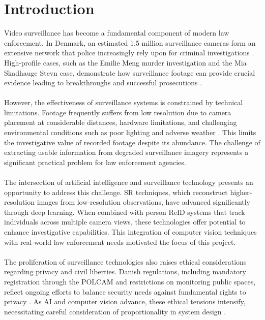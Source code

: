 \chapter{Introduction}
\label{cha:introduction}

Video surveillance has become a fundamental component of modern law enforcement. In Denmark, an estimated 1.5 million surveillance cameras form an extensive network that police increasingly rely upon for criminal investigations \cite{overvagningsekspert2025}. High-profile cases, such as the Emilie Meng murder investigation and the Mia Skadhauge Stevn case, demonstrate how surveillance footage can provide crucial evidence leading to breakthroughs and successful prosecutions \cite{emilie_meng_avisen, mia_stevn_avisen}.
\\\\
However, the effectiveness of surveillance systems is constrained by technical limitations. Footage frequently suffers from low resolution due to camera placement at considerable distances, hardware limitations, and challenging environmental conditions such as poor lighting and adverse weather \cite{arxiv_superres2021}. This limits the investigative value of recorded footage despite its abundance. The challenge of extracting usable information from degraded surveillance imagery represents a significant practical problem for law enforcement agencies.
\\\\
The intersection of artificial intelligence and surveillance technology presents an opportunity to address this challenge. \ac{SR} techniques, which reconstruct higher-resolution images from low-resolution observations, have advanced significantly through deep learning. When combined with person \ac{ReID} systems that track individuals across multiple camera views, these technologies offer potential to enhance investigative capabilities. This integration of computer vision techniques with real-world law enforcement needs motivated the focus of this project. 
\\\\
The proliferation of surveillance technologies also raises ethical considerations regarding privacy and civil liberties. Danish regulations, including mandatory registration through the \ac{POLCAM} and restrictions on monitoring public spaces, reflect ongoing efforts to balance security needs against fundamental rights to privacy \cite{politiet2024registrer, lov_tv_overvaagning2023}. As \ac{AI} and computer vision advance, these ethical tensions intensify, necessitating careful consideration of proportionality in system design \cite{overvagningsekspert2025, menneskeret_overvaagning}.
